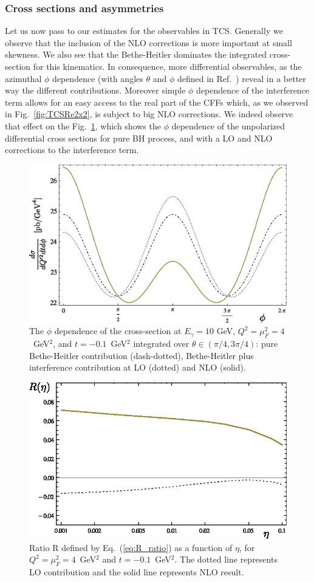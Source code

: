\subsubsection{Cross sections and asymmetries}
Let us now pass to our estimates for the observables in TCS. Generally we
observe that the inclusion of the NLO corrections is more important at small
skewness. We also see that the Bethe-Heitler dominates the integrated
cross-section for this kinematics. In consequence, more differential
observables, as the azimuthal $\phi$ dependence (with angles $\theta$ and
$\phi$ defined in Ref.~\cite{Berger:2001xd}) reveal in a better way the
different contributions. Moreover simple $\phi$ dependence of the interference
term allows for an easy access to the real part of the CFFs which, as we
observed in Fig.~\ref{fig:TCSRe2x2}, is subject to big NLO corrections. We
indeed observe that effect on the Fig.~\ref{fig:xsec_phidep}, which shows the
$\phi$ dependence of the unpolarized differential cross sections for pure BH
process, and with a LO and NLO corrections to the interference term.
%
\begin{figure}[ht]
\begin{center}
 \includegraphics[width=8 cm]{xsec_phidep.eps}
\caption{The $\phi$ dependence of the cross-section at $E_\gamma = 10$ GeV,
 $Q^2 = \mu_F^2 = 4$~GeV$^2$, and $t= -0.1$~GeV$^2$ integrated over $\theta
\in (\pi/4,3\pi/4)$: pure Bethe-Heitler contribution (dash-dotted),
Bethe-Heitler plus interference contribution at LO (dotted) and NLO (solid).}
\label{fig:xsec_phidep}
\end{center}
\end{figure}

\begin{figure}[ht]
\begin{center}
  \includegraphics[width=8 cm]{R.eps}
\caption{Ratio R defined by Eq.~(\ref{eq:R_ratio}) as a function of $\eta$,
for $Q^2 = \mu_F^2 = 4$~GeV$^2$ and $t= -0.1$~GeV$^2$. The dotted line
represents LO contribution and the solid line represents NLO result.}
\label{fig:Ratio_R}
\end{center}
\end{figure}


